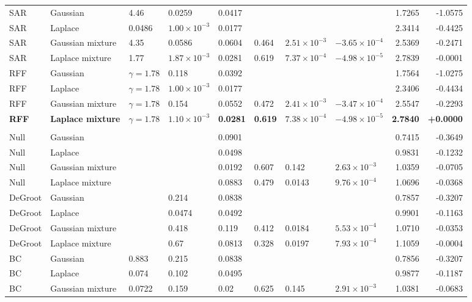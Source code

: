 \begin{longtable}{llllllllrr}
SAR & Gaussian & 4.46 & 0.0259 & 0.0417 &  &  &  & 1.7265 & -1.0575 \\
SAR & Laplace & 0.0486 & $1.00\times10^{-3}$ & 0.0177 &  &  &  & 2.3414 & -0.4425 \\
SAR & Gaussian mixture & 4.35 & 0.0586 & 0.0604 & 0.464 & $2.51\times10^{-3}$ & $-3.65\times10^{-4}$ & 2.5369 & -0.2471 \\
SAR & Laplace mixture & 1.77 & $1.87\times10^{-3}$ & 0.0281 & 0.619 & $7.37\times10^{-4}$ & $-4.98\times10^{-5}$ & 2.7839 & -0.0001 \\
RFF & Gaussian & $\gamma=1.78$ & 0.118 & 0.0392 &  &  &  & 1.7564 & -1.0275 \\
RFF & Laplace & $\gamma=1.78$ & $1.00\times10^{-3}$ & 0.0177 &  &  &  & 2.3406 & -0.4434 \\
RFF & Gaussian mixture & $\gamma=1.78$ & 0.154 & 0.0552 & 0.472 & $2.41\times10^{-3}$ & $-3.47\times10^{-4}$ & 2.5547 & -0.2293 \\
\textbf{RFF} & \textbf{Laplace mixture} & \textbf{$\gamma=1.78$} & \textbf{$1.10\times10^{-3}$} & \textbf{0.0281} & \textbf{0.619} & \textbf{$7.38\times10^{-4}$} & \textbf{$-4.98\times10^{-5}$} & \textbf{2.7840} & \textbf{+0.0000} \\
\midrule
\multicolumn{10}{l}{\markets{}} \\
Null & Gaussian &  &  & 0.0901 &  &  &  & 0.7415 & -0.3649 \\
Null & Laplace &  &  & 0.0498 &  &  &  & 0.9831 & -0.1232 \\
Null & Gaussian mixture &  &  & 0.0192 & 0.607 & 0.142 & $2.63\times10^{-3}$ & 1.0359 & -0.0705 \\
Null & Laplace mixture &  &  & 0.0883 & 0.479 & 0.0143 & $9.76\times10^{-4}$ & 1.0696 & -0.0368 \\
DeGroot & Gaussian &  & 0.214 & 0.0838 &  &  &  & 0.7857 & -0.3207 \\
DeGroot & Laplace &  & 0.0474 & 0.0492 &  &  &  & 0.9901 & -0.1163 \\
DeGroot & Gaussian mixture &  & 0.418 & 0.119 & 0.412 & 0.0184 & $5.53\times10^{-4}$ & 1.0710 & -0.0353 \\
DeGroot & Laplace mixture &  & 0.67 & 0.0813 & 0.328 & 0.0197 & $7.93\times10^{-4}$ & 1.1059 & -0.0004 \\
BC & Gaussian & 0.883 & 0.215 & 0.0838 &  &  &  & 0.7856 & -0.3207 \\
BC & Laplace & 0.074 & 0.102 & 0.0495 &  &  &  & 0.9877 & -0.1187 \\
BC & Gaussian mixture & 0.0722 & 0.159 & 0.02 & 0.625 & 0.145 & $2.91\times10^{-3}$ & 1.0381 & -0.0683 \\

\end{longtable}
